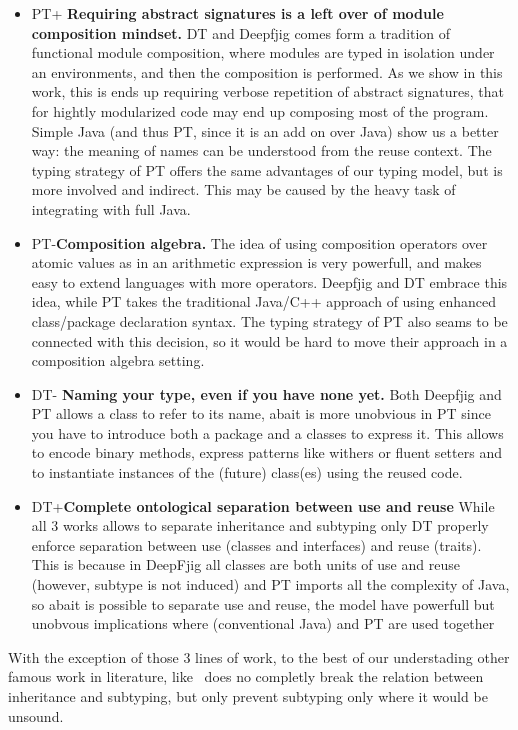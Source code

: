\begin{itemize}
\item PT+
{\bf Requiring abstract signatures is a left over of module composition mindset.}
DT and Deepfjig comes form a tradition of functional module composition, where 
modules are typed in isolation under an environments, and then the composition is performed.
As we show in this work, this is ends up requiring verbose repetition of abstract signatures, 
that for hightly modularized code may end up composing most of the program.
Simple Java (and thus PT, since it is an add on over Java) show us a better way:
the meaning of names can be understood from the reuse context.
The typing strategy of PT offers the same advantages of our typing model, 
but is more involved and indirect. This may be caused by the
heavy task of integrating with full Java.
\item PT-{\bf Composition algebra.}
The idea of using composition operators over atomic values as in an arithmetic expression is very powerfull,
and makes easy to extend languages with more operators. Deepfjig and DT embrace this idea, while PT takes the traditional Java/C++ approach of using enhanced class/package declaration syntax.
The typing strategy of PT also seams to be connected with this decision, so it would be hard to move their approach in a composition algebra setting.
\item DT- {\bf Naming your type, even if you have none yet.}
Both Deepfjig and PT allows a class to refer to its name, abait is more unobvious in PT since you have to introduce both a package and a classes to express it.
This allows to encode binary methods, express patterns like withers or fluent setters and to instantiate instances of the (future) class(es)  using the reused code.
\item DT+{\bf Complete ontological separation between use and reuse}
While all 3 works allows to separate inheritance and subtyping only DT properly enforce 
separation between use (classes and interfaces) and reuse (traits).
This is because in DeepFjig all classes are both units of use and reuse (however, subtype is not induced)
and PT imports all the complexity of Java, so abait is possible to separate use and reuse, the model have powerfull but unobvous implications where (conventional Java) \Q@extends@ and PT are used together

\end{itemize}
With the exception of those 3 lines of work, to the best of our understading
other famous work in literature, like~\cite{odersky2008programming,nystrom2006j}
does no completly break the relation between inheritance and subtyping, but only prevent subtyping only where 
it would be unsound.

